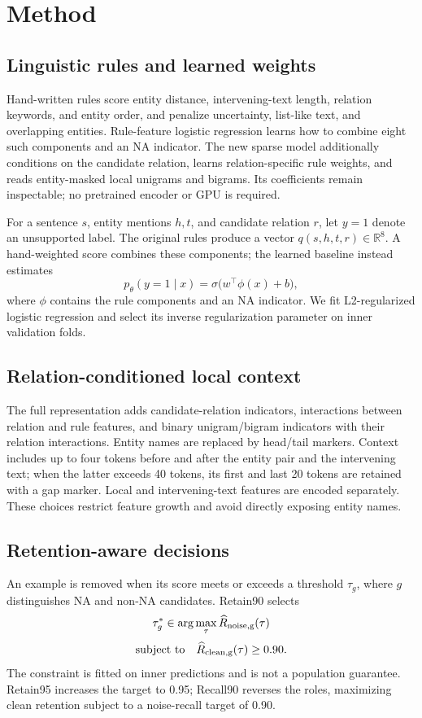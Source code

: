 \documentclass[11pt]{article}
\begin{document}
\section{Method}
\subsection{Linguistic rules and learned weights}

Hand-written rules score entity distance, intervening-text length, relation keywords, and entity order, and penalize uncertainty, list-like text, and overlapping entities. Rule-feature logistic regression learns how to combine eight such components and an NA indicator. The new sparse model additionally conditions on the candidate relation, learns relation-specific rule weights, and reads entity-masked local unigrams and bigrams. Its coefficients remain inspectable; no pretrained encoder or GPU is required.



For a sentence $s$, entity mentions $h,t$, and candidate relation $r$, let $y=1$ denote an unsupported label. The original rules produce a vector $q(s,h,t,r)\in\mathbb{R}^{8}$. A hand-weighted score combines these components; the learned baseline instead estimates
\begin{equation}
p_\theta(y=1\mid x)=\sigma\bigl(w^\top\phi(x)+b\bigr),
\end{equation}
where $\phi$ contains the rule components and an NA indicator. We fit L2-regularized logistic regression and select its inverse regularization parameter on inner validation folds.
\subsection{Relation-conditioned local context}
The full representation adds candidate-relation indicators, interactions between relation and rule features, and binary unigram/bigram indicators with their relation interactions. Entity names are replaced by head/tail markers. Context includes up to four tokens before and after the entity pair and the intervening text; when the latter exceeds 40 tokens, its first and last 20 tokens are retained with a gap marker. Local and intervening-text features are encoded separately. These choices restrict feature growth and avoid directly exposing entity names.
\subsection{Retention-aware decisions}
An example is removed when its score meets or exceeds a threshold $\tau_g$, where $g$ distinguishes NA and non-NA candidates. Retain90 selects
\begin{equation}
\tau_g^*\in\arg\max_{\tau}\widehat{R}_{\rm noise,g}(\tau)
\end{equation}\begin{equation}\text{subject to}\quad\widehat{R}_{\rm clean,g}(\tau)\geq0.90.
\end{equation}
The constraint is fitted on inner predictions and is not a population guarantee. Retain95 increases the target to 0.95; Recall90 reverses the roles, maximizing clean retention subject to a noise-recall target of 0.90.
\end{document}
